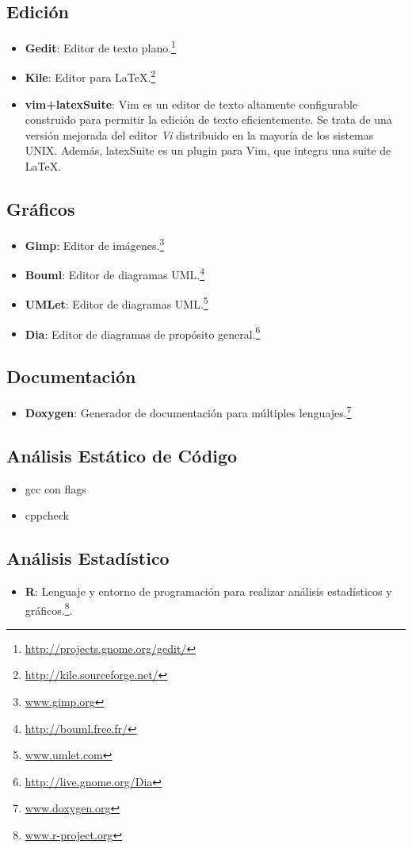 \subsection{Edici\'on}
\begin{itemize}
  \item \textbf{Gedit}: Editor de texto plano.\footnote{\url{http://projects.gnome.org/gedit/}}
  \item \textbf{Kile}: Editor para \LaTeX.\footnote{\url{http://kile.sourceforge.net/}}
 \item \textbf{vim+latexSuite}: Vim es un editor de texto altamente configurable construido para permitir la edici\'on de texto eficientemente.
     Se trata de una versi\'on mejorada del editor \textit{Vi} distribuido en la mayor\'ia de los sistemas UNIX. Adem\'as, latexSuite es un plugin para Vim,
     que integra una suite de \LaTeX.
\end{itemize}

\subsection{Gr\'aficos}
\begin{itemize}
  \item \textbf{Gimp}: Editor de im\'agenes.\footnote{\url{www.gimp.org}}
  \item \textbf{Bouml}: Editor de diagramas UML.\footnote{\url{http://bouml.free.fr/}}
  \item \textbf{UMLet}: Editor de diagramas UML.\footnote{\url{www.umlet.com}}
  \item \textbf{Dia}: Editor de diagramas de prop\'osito general.\footnote{\url{http://live.gnome.org/Dia}}
\end{itemize}

\subsection{Documentaci\'on}
\begin{itemize}
  \item \textbf{Doxygen}: Generador de documentaci\'on para m\'ultiples lenguajes.\footnote{\url{www.doxygen.org}}
\end{itemize}

\subsection{An\'alisis Est\'atico de C\'odigo}
\begin{itemize}
 \item gcc con flags
 \item cppcheck
\end{itemize}

\subsection{An\'alisis Estad\'istico}
\begin{itemize}
  \item \textbf{R}: Lenguaje y entorno de programaci\'on para realizar an\'alisis estad\'isticos y gr\'aficos.\footnote{\url{www.r-project.org}}.
\end{itemize}

